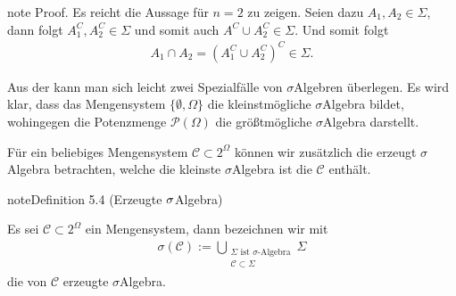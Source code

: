 \documentclass[letterpaper,10pt,german]{jupyterBook}
\begin{document}
\begin{sphinxadmonition}{note}
\sphinxAtStartPar
Proof. Es reicht die Aussage für \(n=2\) zu zeigen. Seien dazu \(A_1,A_2\in\Sigma\), dann folgt \(A_1^C,A_2^C\in\Sigma\) und somit auch \(A^C\cup A_2^C\in\Sigma\). Und somit folgt
\begin{equation*}
\begin{split}A_1\cap A_2 = (A_1^C\cup A_2^C)^C \in \Sigma.\end{split}
\end{equation*}\end{sphinxadmonition}

\sphinxAtStartPar
Aus der {\hyperref[\detokenize{masstheorie/masstheorie:def:sigmaalgebra}]{}} kann man sich leicht zwei Spezialfälle von \(\sigma\)\sphinxhyphen{}Algebren überlegen.
Es wird klar, dass das Mengensystem \(\{\emptyset, \Omega\}\) die kleinstmögliche \(\sigma\)\sphinxhyphen{}Algebra bildet, wohingegen die Potenzmenge \(\mathcal{P}(\Omega)\) die größtmögliche \(\sigma\)\sphinxhyphen{}Algebra darstellt.

\sphinxAtStartPar
Für ein beliebiges Mengensystem \(\mathcal{C}\subset 2^\Omega\) können wir zusätzlich die erzeugt \(\sigma\)\sphinxhyphen{}Algebra betrachten, welche die kleinste \(\sigma\)\sphinxhyphen{}Algebra ist die \(\mathcal{C}\) enthält.
\label{masstheorie/masstheorie:definition-7}
\begin{sphinxadmonition}{note}{Definition 5.4 (Erzeugte \protect\(\sigma\protect\)\sphinxhyphen{}Algebra)}



\sphinxAtStartPar
Es sei \(\mathcal{C}\subset 2^\Omega\) ein Mengensystem, dann bezeichnen wir mit
\begin{equation*}
\begin{split}\sigma(\mathcal{C}) := \bigcup_{\substack{\Sigma \text{ ist $\sigma$-Algebra}\\ \mathcal{C} \subset \Sigma}} \Sigma\end{split}
\end{equation*}
\sphinxAtStartPar
die von \(\mathcal{C}\) erzeugte \(\sigma\)\sphinxhyphen{}Algebra.
\end{sphinxadmonition}
\end{document}
